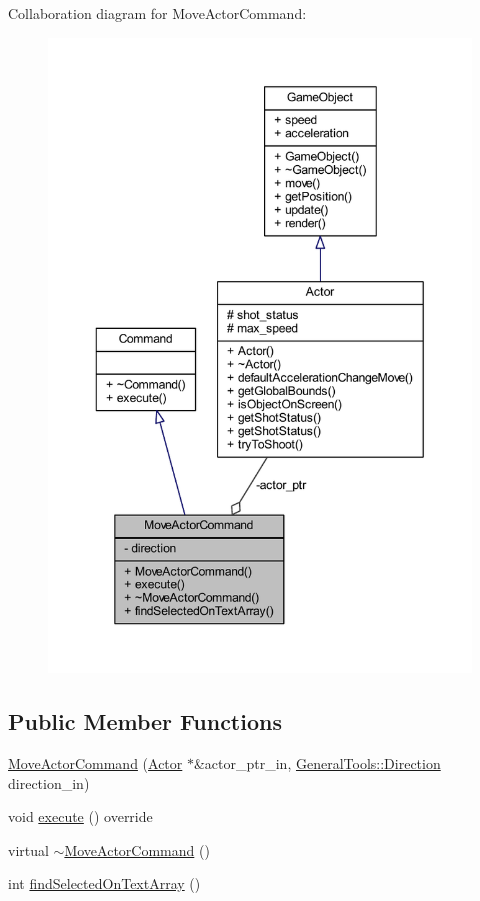 Collaboration diagram for Move\+Actor\+Command\+:
\nopagebreak
\begin{figure}[H]
\begin{center}
\leavevmode
\includegraphics[width=350pt]{class_move_actor_command__coll__graph}
\end{center}
\end{figure}
\subsection*{Public Member Functions}
\begin{DoxyCompactItemize}
\item 
\hyperlink{class_move_actor_command_af042d9025beccabd97665aabd434297e}{Move\+Actor\+Command} (\hyperlink{class_actor}{Actor} $\ast$\&actor\+\_\+ptr\+\_\+in, \hyperlink{namespace_general_tools_afedc3bd242369903830dec92c3ad569b}{General\+Tools\+::\+Direction} direction\+\_\+in)
\item 
void \hyperlink{class_move_actor_command_a62ff2dc8808da57913d1e5aa43c10cfb}{execute} () override
\item 
virtual \hyperlink{class_move_actor_command_a6b826449c1ca94181966deaabeb02ede}{$\sim$\+Move\+Actor\+Command} ()
\item 
int \hyperlink{class_move_actor_command_a4e29605f2a8d05b9d91f622001b22749}{find\+Selected\+On\+Text\+Array} ()
\end{DoxyCompactItemize}
